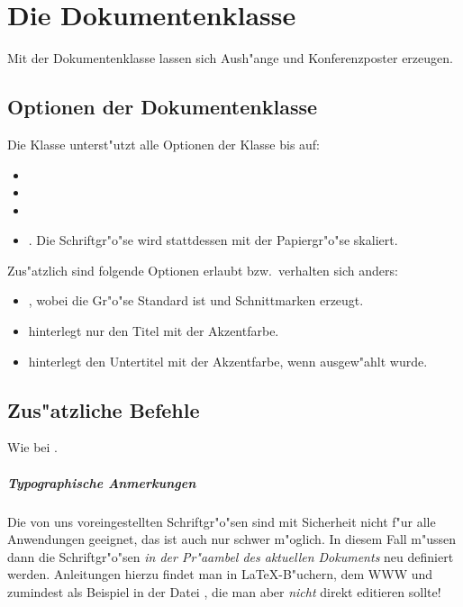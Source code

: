\documentclass[twoside,colorback,accentcolor=tud4c,11pt]{tudreport}
\begin{document}
\chapter{Die Dokumentenklasse \texorpdfstring{}{tudposter}}\label{chap:tudposter}
  
  Mit der Dokumentenklasse  lassen sich Aush"ange und
  Konferenzposter erzeugen.

  \section{Optionen der Dokumentenklasse \texorpdfstring{}{tudposter}}
        
  Die Klasse  unterst"utzt alle Optionen der
   Klasse bis auf:
  \begin{itemize}\itemsep-0.5ex
     \item {}
     \item {}
     \item {}
     \item \textaccent{8pt 9.5pt 11pt 12pt}. Die Schriftgr"o"se wird stattdessen
       mit der Papiergr"o"se skaliert.
  \end{itemize}
  Zus"atzlich sind folgende Optionen erlaubt bzw.\ verhalten sich anders:
  \begin{itemize}\itemsep-0.5ex
    \item {}, wobei die Gr"o"se
       Standard ist und Schnittmarken erzeugt.
    \item {} hinterlegt nur den Titel mit der Akzentfarbe.
    \item {} hinterlegt den Untertitel mit der Akzentfarbe,
      wenn  ausgew"ahlt wurde.
  \end{itemize}
        
  \section{Zus"atzliche Befehle}
    Wie bei .
    

    \paragraph{Typographische Anmerkungen}
    Die von uns voreingestellten Schriftgr"o"sen sind mit Sicherheit nicht f"ur
    alle Anwendungen geeignet, das ist auch nur schwer m"oglich. In diesem
    Fall m"ussen dann die Schriftgr"o"sen \emph{in der Pr"aambel des aktuellen
    Dokuments} neu definiert werden. Anleitungen
    hierzu findet man in \LaTeX-B"uchern, dem WWW und zumindest als Beispiel
    in der Datei , die man aber \emph{nicht}
    direkt editieren sollte!
\end{document}
